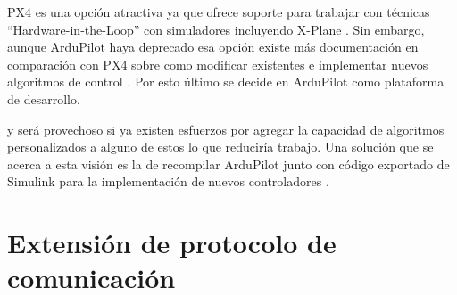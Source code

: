 PX4 es una opción atractiva ya que ofrece soporte para trabajar con técnicas ``Hardware-in-the-Loop'' con simuladores incluyendo X-Plane \cite{px4-hitl}. Sin embargo, aunque ArduPilot haya deprecado esa opción \cite{ap-hitl} existe más documentación en comparación con PX4 sobre como modificar existentes e implementar nuevos algoritmos de control \cite{ap-custom-controller}. Por esto último se decide en ArduPilot como plataforma de desarrollo.

y será provechoso si ya existen esfuerzos por agregar la capacidad de algoritmos personalizados a alguno de estos lo que reduciría trabajo. Una solución que se acerca a esta visión es la de recompilar ArduPilot junto con código exportado de Simulink para la implementación de nuevos controladores \cite{ardupilot-custom}.

\section{Extensión de protocolo de comunicación}
